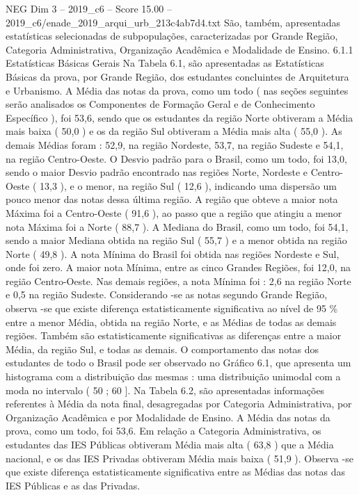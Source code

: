 \begin{textsample}{NEG Dim 3 – 2019\_c6 – Score 15.00 – 2019\_c6/enade\_2019\_arqui\_urb\_213c4ab7d4.txt}
São, também, apresentadas estatísticas selecionadas de subpopulações, caracterizadas por Grande Região, Categoria Administrativa, Organização Acadêmica e Modalidade de Ensino. 6.1.1 Estatísticas Básicas Gerais Na Tabela 6.1, são apresentadas as Estatísticas Básicas da prova, por Grande Região, dos estudantes concluintes de Arquitetura e Urbanismo.
A Média das notas da prova, como um todo ( nas seções seguintes serão analisados os Componentes de Formação Geral e de Conhecimento Específico ), foi 53,6, sendo que os estudantes da região Norte obtiveram a Média mais baixa ( 50,0 ) e os da região Sul obtiveram a Média mais alta ( 55,0 ).
As demais Médias foram : 52,9, na região Nordeste, 53,7, na região Sudeste e 54,1, na região Centro-Oeste.
O Desvio padrão para o Brasil, como um todo, foi 13,0, sendo o maior Desvio padrão encontrado nas regiões Norte, Nordeste e Centro-Oeste ( 13,3 ), e o menor, na região Sul ( 12,6 ), indicando uma dispersão um pouco menor das notas dessa última região.
A região que obteve a maior nota Máxima foi a Centro-Oeste ( 91,6 ), ao passo que a região que atingiu a menor nota Máxima foi a Norte ( 88,7 ).
A Mediana do Brasil, como um todo, foi 54,1, sendo a maior Mediana obtida na região Sul ( 55,7 ) e a menor obtida na região Norte ( 49,8 ).
A nota Mínima do Brasil foi obtida nas regiões Nordeste e Sul, onde foi zero.
A maior nota Mínima, entre as cinco Grandes Regiões, foi 12,0, na região Centro-Oeste.
Nas demais regiões, a nota Mínima foi : 2,6 na região Norte e 0,5 na região Sudeste.
Considerando -se as notas segundo Grande Região, observa -se que existe diferença estatisticamente significativa ao nível de 95 \% entre a menor Média, obtida na região Norte, e as Médias de todas as demais regiões.
Também são estatisticamente significativas as diferenças entre a maior Média, da região Sul, e todas as demais.
O comportamento das notas dos estudantes de todo o Brasil pode ser observado no Gráfico 6.1, que apresenta um histograma com a distribuição das mesmas : uma distribuição unimodal com a moda no intervalo ( 50 ; 60 ].
Na Tabela 6.2, são apresentadas informações referentes à Média da nota final, desagregadas por Categoria Administrativa, por Organização Acadêmica e por Modalidade de Ensino.
A Média das notas da prova, como um todo, foi 53,6.
Em relação a Categoria Administrativa, os estudantes das IES Públicas obtiveram Média mais alta ( 63,8 ) que a Média nacional, e os das IES Privadas obtiveram Média mais baixa ( 51,9 ).
Observa -se que existe diferença estatisticamente significativa entre as Médias das notas das IES Públicas e as das Privadas.

\end{textsample}
